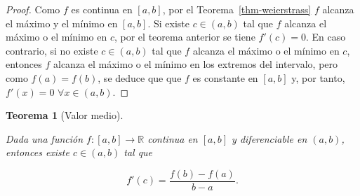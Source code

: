 \documentclass[
  a4paper,
]{scrreport}
\theoremstyle{plain}
\newtheorem{theorem}{Teorema}[chapter]
\theoremstyle{definition}
\theoremstyle{plain}
\theoremstyle{plain}
\theoremstyle{definition}
\theoremstyle{definition}
\theoremstyle{remark}
\begin{document}
\begin{tcolorbox}[enhanced jigsaw, titlerule=0mm, arc=.35mm, colframe=quarto-callout-note-color-frame, bottomrule=.15mm, opacitybacktitle=0.6, rightrule=.15mm, coltitle=black, colback=white, toprule=.15mm, title=\textcolor{quarto-callout-note-color}{\faInfo}\hspace{0.5em}{Demostración}, leftrule=.75mm, bottomtitle=1mm, opacityback=0, breakable, colbacktitle=quarto-callout-note-color!10!white, toptitle=1mm, left=2mm]

\begin{proof}
Como \(f\) es continua en \([a,b]\), por el
Teorema~\ref{thm-weierstrass} \(f\) alcanza el máximo y el mínimo en
\([a,b]\). Si existe \(c\in (a,b)\) tal que \(f\) alcanza el máximo o el
mínimo en \(c\), por el teorema anterior se tiene \(f'(c)=0\). En caso
contrario, si no existe \(c\in(a,b)\) tal que \(f\) alcanza el máximo o
el mínimo en \(c\), entonces \(f\) alcanza el máximo o el mínimo en los
extremos del intervalo, pero como \(f(a)=f(b)\), se deduce que que \(f\)
es constante en \([a,b]\) y, por tanto, \(f'(x)=0\)
\(\forall x\in (a,b)\).
\end{proof}

\end{tcolorbox}

\begin{theorem}[Valor
medio]\protect\hypertarget{thm-valor-medio}{}\label{thm-valor-medio}

Dada una función \(f:[a,b]\to\mathbb{R}\) continua en \([a,b]\) y
diferenciable en \((a,b)\), entonces existe \(c\in (a,b)\) tal que

\[
f'(c) = \frac{f(b)-f(a)}{b-a}.
\]

\end{theorem}
\end{document}
